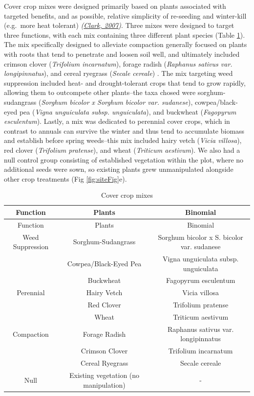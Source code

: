 \documentclass[
  12pt,
]{article}
\begin{document}
Cover crop mixes were designed primarily based on plants associated with targeted benefits, and as possible, relative simplicity of re-seeding and winter-kill (e.g.~more heat tolerant) \emph{(\protect\hyperlink{ref-clark07}{Clark, 2007})}.
Three mixes were designed to target three functions, with each mix containing three different plant species (Table \ref{tab:crops}).
The mix specifically designed to alleviate compaction generally focused on plants with roots that tend to penetrate and loosen soil well, and ultimately included
crimson clover (\emph{Trifolium incarnatum}),
forage radish (\emph{Raphanus sativus var. longipinnatus}), and
cereal ryegrass (\emph{Secale cereale})
.
The mix targeting weed suppression included heat- and drought-tolerant crops that tend to grow rapidly, allowing them to outcompete other plants--the taxa chosed were
sorghum-sudangrass (\emph{Sorghum bicolor x Sorghum bicolor var. sudanese}),
cowpea/black-eyed pea (\emph{Vigna unguiculata subsp. unguiculata}), and
buckwheat (\emph{Fagopyrum esculentum}).
Lastly, a mix was dedicated to perennial cover crops, which in contrast to annuals can survive the winter and thus tend to accumulate biomass and establish before spring weeds--this mix included
hairy vetch (\emph{Vicia villosa}),
red clover (\emph{Trifolium pratense}), and
wheat (\emph{Triticum aestivum}).
We also had a null control group consisting of established vegetation within the plot, where no additional seeds were sown, so existing plants grew unmanipulated alongside other crop treatments (Fig \ref{fig:siteFig}e).

\begin{longtable}[]{@{}ccc@{}}
\caption{\label{tab:crops}Cover crop mixes}\tabularnewline
\toprule
Function & Plants & Binomial \\
\midrule
\endfirsthead
\toprule
Function & Plants & Binomial \\
\midrule
\endhead
Weed Suppression & Sorghum-Sudangrass & Sorghum bicolor x S. bicolor var. sudanese \\
& Cowpea/Black-Eyed Pea & Vigna unguiculata subsp. unguiculata \\
& Buckwheat & Fagopyrum esculentum \\
Perennial & Hairy Vetch & Vicia villosa \\
& Red Clover & Trifolium pratense \\
& Wheat & Triticum aestivum \\
Compaction & Forage Radish & Raphanus sativus var. longipinnatus \\
& Crimson Clover & Trifolium incarnatum \\
& Cereal Ryegrass & Secale cereale \\
Null & Existing vegetation (no manipulation) & - \\
\bottomrule
\end{longtable}
\end{document}
